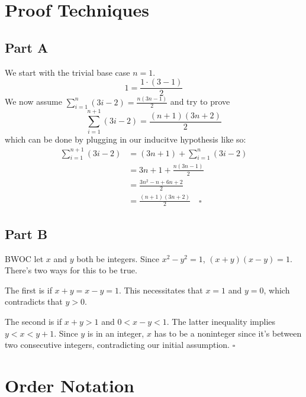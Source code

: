 \documentclass[12pt]{article}
\begin{document}
\section{Proof Techniques}

\subsection*{Part A}

We start with the trivial base case $n=1$.
\[1=\frac{1 \cdot (3 - 1)}{2}\]
We now assume $\sum_{i=1}^{n} (3i-2)=\frac{n(3n-1)}{2}$ and try to prove
\[\sum_{i=1}^{n+1} (3i-2) = \frac{(n+1)(3n+2)}{2}\]
which can be done by plugging in our inducitve hypothesis like so:
\begin{align*}
    \sum_{i=1}^{n+1} (3i-2) & = (3n+1) + \sum_{i=1}^{n} (3i-2)    \\
                            & = 3n+1+\frac{n(3n-1)}{2}            \\
                            & = \frac{3n^2-n+6n+2}{2}             \\
                            & = \frac{(n+1)(3n+2)}{2}\quad\square
\end{align*}

\subsection*{Part B}

BWOC let $x$ and $y$ both be integers.
Since $x^2-y^2=1$, $(x+y)(x-y)=1$.
There's two ways for this to be true.

The first is if $x+y=x-y=1$.
This necessitates that $x=1$ and $y=0$, which contradicts that $y>0$.

The second is if $x+y>1$ and $0<x-y<1$.
The latter inequality implies $y<x<y+1$.
Since $y$ is in an integer, $x$ has to be a noninteger since it's between
two consecutive integers, contradicting our initial assumption. $\square$

\section{Order Notation}
\end{document}
